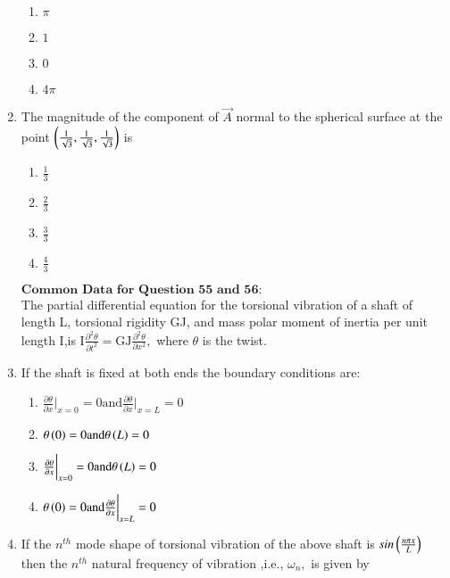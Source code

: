 \documentclass[journal]{IEEEtran}
\begin{document}
\begin{enumerate}[start=49]
\begin{multicols}{4}
    \begin{enumerate}
        \item $\pi$
        \item $1$
        \item $0$
        \item $4\pi$        
    \end{enumerate}
\end{multicols}
\bigskip
\item The magnitude of the component of $\overrightarrow{A}$ normal to the spherical surface at the point $\left(\frac{1}{\sqrt{3}},\frac{1}{\sqrt{3}},\frac{1}{\sqrt{3}}\right)$ is 
\begin{multicols}{4}
    \begin{enumerate}
        \item $\frac{1}{3}$
        \item $\frac{2}{3}$
        \item $\frac{3}{3}$
        \item $\frac{4}{3}$        
    \end{enumerate}
\end{multicols}
\bigskip
$\textbf{Common Data for Question 55 and 56:}$\\
The partial differential equation for the torsional vibration of a shaft of length L, torsional rigidity GJ, and mass polar moment of inertia per unit length I,is $\text{I}\frac{\partial^{2}\theta}{\partial t^{2}}=\text{GJ}\frac{\partial^{2}\theta}{\partial x^{2}},$ where $\theta$ is the twist. \bigskip
\item If the shaft is fixed at both ends the boundary conditions are:
\begin{multicols}{2}
    \begin{enumerate}
        \item $\frac{\partial \theta}{\partial x}\bigg|_{x=0}=0 \text{and} \frac{\partial \theta}{\partial x} \bigg|_{x=L}=0$
        \item $\theta\left(0\right)=0 \text{and} \theta\left(L\right)=0$
        \item $\frac{\partial \theta}{\partial x} \bigg|_{x=0}=0 \text{and} \theta\left(L\right)=0$
        \item $\theta\left(0\right)=0 \text{and} \frac{\partial \theta}{\partial x} \bigg|_{x=L}=0$        
    \end{enumerate}
\end{multicols}    
\bigskip
\item If the $n^{th}$ mode shape of torsional vibration of the above shaft is $sin\left(\frac{n\pi x}{L}\right)$ then the $n^{th}$ natural frequency of vibration ,i.e., $\omega_{n},$ is given by 

\end{enumerate}
\end{document}
